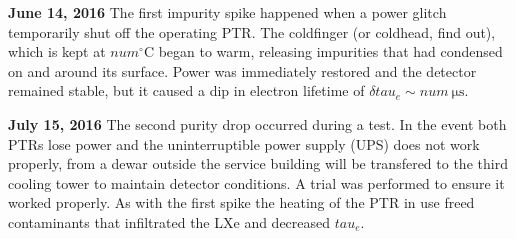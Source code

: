 \textbf{June 14, 2016}  The first impurity spike happened when a power glitch temporarily shut off the operating PTR.  The coldfinger (or
coldhead, find out), which is kept at $num^{\circ} \mathrm{C}$ began to warm, releasing impurities that had condensed on and around its
surface.  Power was immediately restored and the detector remained stable, but it caused a dip in electron lifetime of
$\delta tau_e \sim num\ \mathrm{\mu s}$.

\textbf{July 15, 2016}  The second purity drop occurred during a \lntwo test.  In the event both PTRs lose power and the uninterruptible
power supply
(UPS) does not work properly, \lntwo from a dewar outside the service building will be transfered to the third cooling tower to maintain
detector conditions.  A trial was performed to ensure it worked properly.  As with the first spike the heating of the PTR in use freed
contaminants that infiltrated the LXe and decreased $tau_e$.

\begin{table}
\centering
{}
\caption{Purity drops over the lifetime of XENON1T.  Dates and expected causes are given, along with detector region (GXe or LXe) impurity
release is thought to occur.  Cathode voltage and PTR power outages are given as they are believed to contribute to LXe and GXe
contaminations, respectively.}
\label{tab:electron_lifetime_model_detector_effects_spikes_dates}
\end{table}

